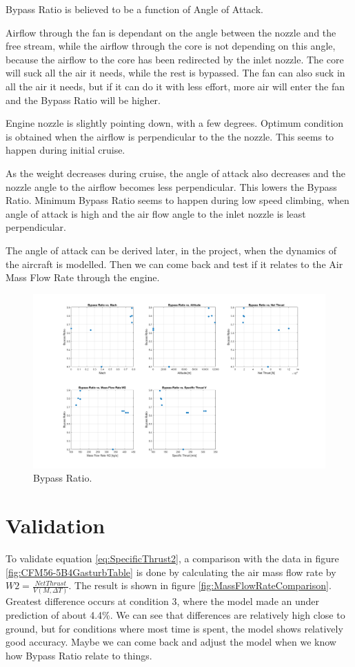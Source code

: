 \documentclass[english]{kththesis}
\begin{document}
Bypass Ratio is believed to be a function of Angle of Attack.

Airflow through the fan is dependant on the angle between the nozzle and the free stream, while the airflow through the core is not depending on this angle, because the airflow to the core has been redirected by the inlet nozzle. The core will suck all the air it needs, while the rest is bypassed. The fan can also suck in all the air it needs, but if it can do it with less effort, more air will enter the fan and the Bypass Ratio will be higher.

Engine nozzle is slightly pointing down, with a few degrees. Optimum condition is obtained when the airflow is perpendicular to the the nozzle. This seems to happen during initial cruise.

As the weight decreases during cruise, the angle of attack also decreases and the nozzle angle to the airflow becomes less perpendicular. This lowers the Bypass Ratio. Minimum Bypass Ratio seems to happen during low speed climbing, when angle of attack is high and the air flow angle to the inlet nozzle is least perpendicular.

The angle of attack can be derived later, in the project, when the dynamics of the aircraft is modelled. Then we can come back and test if it relates to the Air Mass Flow Rate through the engine.

\begin{figure}[hb]
    \centering
    \includegraphics[width=1\textwidth]{Epictures/BetaVsEveryThing.png}
    \caption{Bypass Ratio.}
    \label{fig:BypassRatio}
\end{figure}

\clearpage

\section{Validation}
To validate equation \ref{eq:SpecificThrust2}, a comparison with the data in figure \ref{fig:CFM56-5B4GasturbTable} is done by calculating the air mass flow rate by $W2 = \frac{Net Thrust}{V(M,\Delta T)} $. The result is shown in figure \ref{fig:MassFlowRateComparison}. Greatest difference occurs at condition 3, where the model made an under prediction of about 4.4\%. We can see that differences are relatively high close to ground, but for conditions where most time is spent, the model shows relatively good accuracy. Maybe we can come back and adjust the model when we know how Bypass Ratio relate to things.
\end{document}
